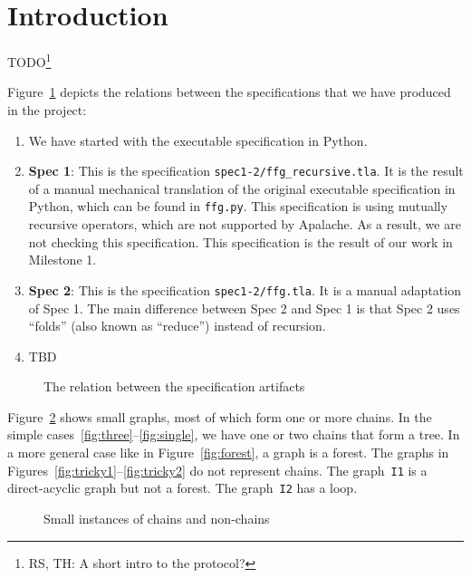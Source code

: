 
\section{Introduction}

TODO\footnote{RS, TH: A short intro to the protocol?}

Figure~\ref{fig:artifacts} depicts the relations between the specifications
that we have produced in the project:

\begin{enumerate}
    \item We have started with the executable specification in Python.

    \item \textbf{Spec 1}: This is the specification
        \texttt{spec1-2/ffg\_recursive.tla}. It is the result of a manual
        mechanical translation of the original executable specification in
        Python, which can be found in \texttt{ffg.py}. This specification is
        using mutually recursive operators, which are not supported by
        Apalache. As a result, we are not checking this specification. This
        specification is the result of our work in Milestone 1.

    \item \textbf{Spec 2}: This is the specification \texttt{spec1-2/ffg.tla}. It
        is a manual adaptation of Spec 1. The main difference between Spec 2
        and Spec 1 is that Spec 2 uses ``folds'' (also known as ``reduce'')
        instead of recursion.

    \item TBD

\end{enumerate}

\begin{figure}
  
  \caption{The relation between the specification artifacts}\label{fig:artifacts}
\end{figure}

Figure~\ref{fig:block-graphs} shows small graphs, most of which form one or
more chains. In the simple cases~\ref{fig:three}--\ref{fig:single}, we have one
or two chains that form a tree. In a more general case like in
Figure~\ref{fig:forest}, a graph is a forest. The graphs in
Figures~\ref{fig:tricky1}--\ref{fig:tricky2} do not represent chains.  The
graph~\texttt{I1} is a direct-acyclic graph but not a forest. The
graph~\texttt{I2} has a loop.

\begin{figure}
  
  \caption{Small instances of chains and non-chains}\label{fig:block-graphs}
\end{figure}

